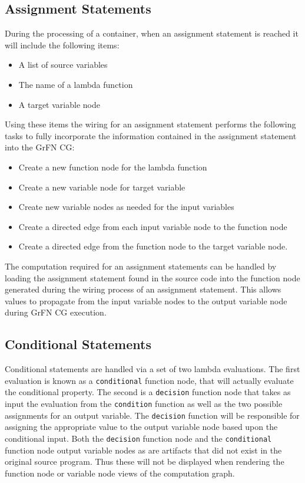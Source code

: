 \subsection{Assignment Statements\label{sec:assg_stmts}}
During the processing of a container, when an assignment statement is reached it will include the following items:
\begin{itemize}
  \item A list of source variables
  \item The name of a lambda function
  \item A target variable node
\end{itemize}
Using these items the wiring for an assignment statement performs the following tasks to fully incorporate the information contained in the assignment statement into the GrFN CG:
\begin{itemize}
  \item Create a new function node for the lambda function
  \item Create a new variable node for target variable
  \item Create new variable nodes as needed for the input variables
  \item Create a directed edge from each input variable node to the function node
  \item Create a directed edge from the function node to the target variable node.
\end{itemize}
The computation required for an assignment statements can be handled by loading the assignment statement found in the source code into the function node generated during the wiring process of an assignment statement.
This allows values to propagate from the input variable nodes to the output variable node during GrFN CG execution.

\subsection{Conditional Statements\label{sec:cond_stmts}}
Conditional statements are handled via a set of two lambda evaluations.
The first evaluation is known as a \texttt{conditional} function node, that will actually evaluate the conditional property.
The second is a \texttt{decision} function node that takes as input the evaluation from the \texttt{condition} function as well as the two possible assignments for an output variable.
The \texttt{decision} function will be responsible for assigning the appropriate value to the output variable node based upon the conditional input.
Both the \texttt{decision} function node and the \texttt{conditional} function node output variable nodes as are artifacts that did not exist in the original source program.
Thus these will not be displayed when rendering the function node or variable node views of the computation graph.

